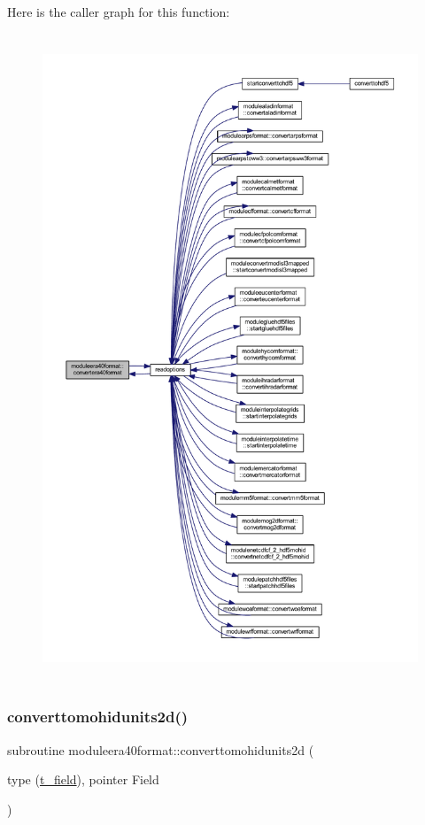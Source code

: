 Here is the caller graph for this function\+:\nopagebreak
\begin{figure}[H]
\begin{center}
\leavevmode
\includegraphics[height=550pt]{namespacemoduleera40format_a0ebf94dc06f2741d57181016580896b9_icgraph}
\end{center}
\end{figure}
\mbox{\label{namespacemoduleera40format_a4a4d9db2a785bd8a90d6860faf58c6bf}} 
\subsubsection{\texorpdfstring{converttomohidunits2d()}{converttomohidunits2d()}}
{\footnotesize\ttfamily subroutine moduleera40format\+::converttomohidunits2d (\begin{DoxyParamCaption}\item[{type (\mbox{\hyperlink{structmoduleera40format_1_1t__field}{t\+\_\+field}}), pointer}]{Field }\end{DoxyParamCaption})\hspace{0.3cm}{\ttfamily [private]}}

